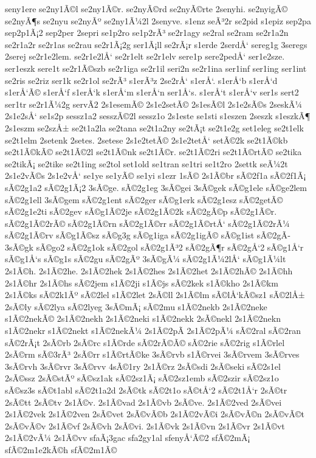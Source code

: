 {seny1ere
se2ny1Ã©l
se2ny1Ã©r.
se2nyÃ©rd
se2nyÃ©rte
2senyhi.
se2nyigÃ©
se2nyÃ¶s
se2nyu
se2nyÃº
se2ny1Ã¼2l
2senyve.
s1enz
seÃ³2r
se2pid
s1epiz
sep2pa
sep2p1Ã¡2
sep2per
2sepri
se1p2ro
se1p2rÃ³
se2r1agy
se2ral
se2ram
se2r1a2n
se2r1a2r
se2r1as
se2rau
se2r1Ã¡2g
ser1Ã¡ll
se2rÃ¡r
s1erde
2serdÅ‘
sereg1g
3seregs
2serej
se2r1e2lem.
se2r1e2lÅ‘
se2r1elt
se2r1elv
sere1p
sere2pedÅ‘
ser1e2sze.
ser1eszk
sere1t
se2r1Ã©szb
se2r1iga
se2r1il
seri2n
se2r1ina
ser1inf
ser1ing
ser1int
se2ris
se2riz
ser1k
se2r1ol
se2rÃ³
s1erÃ³z
2se2rÅ‘
s1erÅ‘.
s1erÅ‘b
s1erÅ‘d
s1erÅ‘Ã©
s1erÅ‘f
s1erÅ‘k
s1erÅ‘m
s1erÅ‘n
ser1Å‘s.
s1erÅ‘t
s1erÅ‘v
ser1s
sert2
ser1tr
se2r1Ã¼2g
servÃ­2
2s1esemÃ©
2s1e2setÃ©
2s1esÃ©l
2s1e2sÃ©s
2seskÃ¼
2s1e2sÅ‘
se1s2p
sessz1a2
sesszÃ©2l
sessz1o
2s1este
se1sti
s1eszen
2seszk
s1eszkÃ¶
2s1eszm
se2szÅ±
se2t1a2la
se2tana
se2t1a2ny
se2tÃ¡t
se2t1e2g
set1eleg
se2t1elk
se2t1elm
2setenk
2setes.
2setese
2s1e2tetÃ©
2s1e2tetÅ‘
setÃ©2k
se2t1Ã©kb
se2t1Ã©kÃ©
se2t1Ã©2l
se2t1Ã©nk
se2t1Ã©r.
se2t1Ã©2ri
se2t1Ã©rtÃ©
se2tika
se2tikÃ¡
se2tike
se2t1ing
se2tol
set1old
se1tran
se1tri
se1t2ro
2settk
seÃ¼2t
2s1e2vÃ©s
2s1e2vÅ‘
se1ye
se1yÃ©
se1yi
s1ezr
1sÃ©
2s1Ã©br
sÃ©2f1a
sÃ©2f1Ã¡
sÃ©2g1a2
sÃ©2g1Ã¡2
3sÃ©ge.
sÃ©2g1eg
3sÃ©gei
3sÃ©gek
sÃ©g1ele
sÃ©ge2lem
sÃ©2g1ell
3sÃ©gem
sÃ©2g1ent
sÃ©2ger
sÃ©g1erk
sÃ©2g1esz
sÃ©2getÃ©
sÃ©2g1e2ti
sÃ©2gev
sÃ©g1Ã©2je
sÃ©2g1Ã©2k
sÃ©2gÃ©p
sÃ©2g1Ã©r.
sÃ©2g1Ã©2rÃ©
sÃ©2g1Ã©rn
sÃ©2g1Ã©rr
sÃ©2g1Ã©rtÅ‘
sÃ©2g1Ã©2rÃ¼
sÃ©2g1Ã©rv
sÃ©g1Ã©sz
sÃ©g3g
sÃ©g1iga
sÃ©2g1igÃ©
sÃ©g1ist
sÃ©2gÃ­
3sÃ©gk
sÃ©go2
sÃ©2g1ok
sÃ©2gol
sÃ©2g1Ã³2
sÃ©2gÃ¶r
sÃ©2gÅ‘2
sÃ©g1Å‘r
sÃ©g1Å‘s
sÃ©g1s
sÃ©2gu
sÃ©2gÃº
3sÃ©gÃ¼
sÃ©2g1Ã¼2lÅ‘
sÃ©g1Ã¼lt
2s1Ã©h.
2s1Ã©2he.
2s1Ã©2hek
2s1Ã©2hes
2s1Ã©2het
2s1Ã©2hÃ©
2s1Ã©hh
2s1Ã©hr
2s1Ã©hs
sÃ©2jem
s1Ã©2ji
s1Ã©js
sÃ©2kek
s1Ã©kho
2s1Ã©km
2s1Ã©ks
sÃ©2k1Ãº
sÃ©2lel
s1Ã©2let
2sÃ©ll
2s1Ã©lm
sÃ©lÅ‘kÃ©sz1
sÃ©2lÅ±
2sÃ©ly
sÃ©2lya
sÃ©2lyeg
3sÃ©mÃ¡
sÃ©2mu
s1Ã©2nekb
2s1Ã©2neke
s1Ã©2nekÃ©
2s1Ã©2nekh
2s1Ã©2neki
s1Ã©2nekk
2sÃ©nekl
2s1Ã©2nekn
s1Ã©2nekr
s1Ã©2nekt
s1Ã©2nekÃ¼
2s1Ã©2pÃ­
2s1Ã©2pÃ¼
sÃ©2ral
sÃ©2ran
sÃ©2rÃ¡t
2sÃ©rb
2sÃ©rc
s1Ã©rde
sÃ©2rÃ©Ã©
sÃ©2rie
sÃ©2rig
s1Ã©rlel
2sÃ©rm
sÃ©3rÃ³
2sÃ©rr
s1Ã©rtÃ©ke
3sÃ©rvb
s1Ã©rvei
3sÃ©rvem
3sÃ©rves
3sÃ©rvh
3sÃ©rvr
3sÃ©rvv
4sÃ©1ry
2s1Ã©rz
2sÃ©sdi
2sÃ©seki
sÃ©2s1el
2sÃ©ssz
2sÃ©stÃº
sÃ©sz1ak
sÃ©2sz1Ã¡
sÃ©2sz1emb
sÃ©2szir
sÃ©2sz1o
sÃ©sz3s
sÃ©t1abl
sÃ©2t1a2d
2sÃ©tk
sÃ©2t1o
sÃ©tÅ‘2
sÃ©2t1Å‘r
2sÃ©tr
2sÃ©tt
2sÃ©tv
2s1Ã©v.
2s1Ã©vad
2s1Ã©vb
2sÃ©ve.
2s1Ã©2ved
2sÃ©vei
2s1Ã©2vek
2s1Ã©2ven
2sÃ©vet
2sÃ©vÃ©b
2s1Ã©2vÃ©i
2sÃ©vÃ©n
2sÃ©vÃ©t
2sÃ©vÃ©v
2s1Ã©vf
2sÃ©vh
2sÃ©vi.
2s1Ã©vk
2s1Ã©vn
2s1Ã©vr
2s1Ã©vt
2s1Ã©2vÃ¼
2s1Ã©vv
sfaÃ¡3gac
sfa2gy1al
sfenyÅ‘Ã©2
sfÃ©2mÃ¡
sfÃ©2m1e2kÃ©h
sfÃ©2m1Ã©
}
